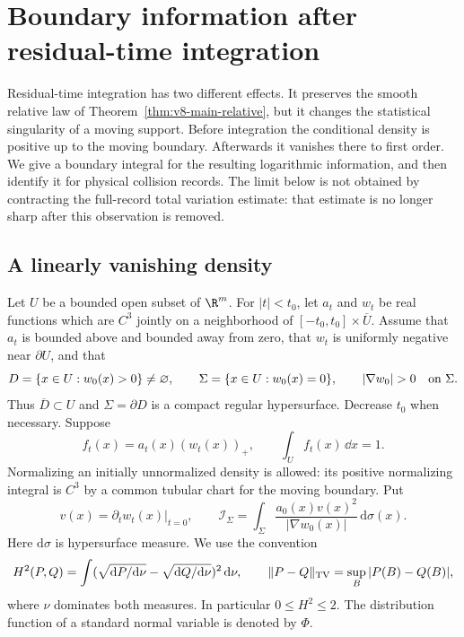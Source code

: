 \section{Boundary information after residual-time integration}
\label{sec:v17-boundary-information}
Residual-time integration has two different effects. It preserves the
smooth relative law of Theorem~\ref{thm:v8-main-relative}, but it changes
the statistical singularity of a moving support. Before integration the
conditional density is positive up to the moving boundary. Afterwards it
vanishes there to first order. We give a boundary integral for the
resulting logarithmic information, and then identify it for physical
collision records. The limit below is not obtained by contracting the
full-record total variation estimate: that estimate is no longer sharp
after this observation is removed.

\subsection{A linearly vanishing density}
Let $U$ be a bounded open subset of $\R^m$. For $|t|<t_0$, let $a_t$
and $w_t$ be real functions which are $C^3$ jointly on a neighborhood of
$[-t_0,t_0]\times\overline U$. Assume that $a_t$ is bounded above and
bounded away from zero, that $w_t$ is uniformly negative near $\partial U$,
and that
\[
 D=\{x\in U:w_0(x)>0\}\ne\varnothing,\qquad
 \Sigma=\{x\in U:w_0(x)=0\},\qquad
                  |\nabla w_0|>0\quad\hbox{on }\Sigma.
\]
Thus $\overline D\subset U$ and $\Sigma=\partial D$ is a compact
regular hypersurface. Decrease $t_0$ when necessary. Suppose
\begin{equation}\label{eq:v17-linear-density}
       f_t(x)=a_t(x)(w_t(x))_+,
       \qquad \int_U f_t(x)\,\dd x=1.
\end{equation}
Normalizing an initially unnormalized density is allowed: its positive
normalizing integral is $C^3$ by a common tubular chart for the moving
boundary. Put
\begin{equation}\label{eq:v17-boundary-form}
 v(x)=\left.\partial_t w_t(x)\right|_{t=0},\qquad
 \mathcal I_{\Sigma}=
       \int_\Sigma\frac{a_0(x)v(x)^2}{|\nabla w_0(x)|}\,
                                      \mathrm d\sigma(x).
\end{equation}
Here $\mathrm d\sigma$ is hypersurface measure. We use the convention
\[
 H^2(P,Q)=\int(\sqrt{\mathrm dP/\mathrm d\nu}
                   -\sqrt{\mathrm dQ/\mathrm d\nu})^2\,\mathrm d\nu,
 \qquad \|P-Q\|_{\rm TV}=\sup_B|P(B)-Q(B)|,
\]
where $\nu$ dominates both measures. In particular $0\le H^2\le2$.
The distribution function of a standard normal variable is denoted by
$\Phi$.

